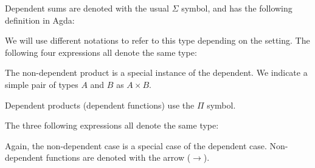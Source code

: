 \begin{definition}
  Dependent sums are denoted with the usual \(\Sigma\) symbol, and has the
  following definition in Agda:

  \begin{center}
    \begin{agdalisting}
    \end{agdalisting}
  \end{center}
  We will use different notations to refer to this type depending on the
  setting.
  The following four expressions all denote the same type:

  \begin{multicols}{4} \centering
    \begin{agdalisting}
    \end{agdalisting}

    \begin{agdalisting}
    \end{agdalisting}

    \begin{agdalisting}
    \end{agdalisting}

    \begin{agdalisting}
    \end{agdalisting}
  \end{multicols}

  The non-dependent product is a special instance of the dependent.
  We indicate a simple pair of types \(A\) and \(B\) as \(A \times B\).
\end{definition}
\begin{definition}
  Dependent products (dependent functions) use the \(\Pi\) symbol.

  The three following expressions all denote the same type:

  \begin{multicols}{3} \centering
    \begin{agdalisting}
    \end{agdalisting}

    \begin{agdalisting}
    \end{agdalisting}

    \begin{agdalisting}
    \end{agdalisting}
  \end{multicols}

  Again, the non-dependent case is a special case of the dependent case.
  Non-dependent functions are denoted with the arrow (\(\rightarrow\)).
\end{definition}

